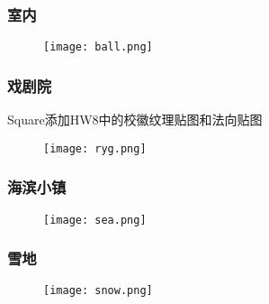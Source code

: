 \documentclass[14pt]{scrartcl} %
\begin{document}
\subsubsection{室内}

\begin{figure}[h] %
	\centering
	\texttt{[image: ball.png]} %
\end{figure}

\subsubsection{戏剧院}
Square添加HW8中的校徽纹理贴图和法向贴图
\begin{figure}[h] %
	\centering
	\texttt{[image: ryg.png]} %
\end{figure}

\pagebreak

\subsubsection{海滨小镇}

\begin{figure}[h] %
	\centering
	\texttt{[image: sea.png]} %
\end{figure}

\subsubsection{雪地}

\begin{figure}[h] %
	\centering
	\texttt{[image: snow.png]} %
\end{figure}
\end{document}
